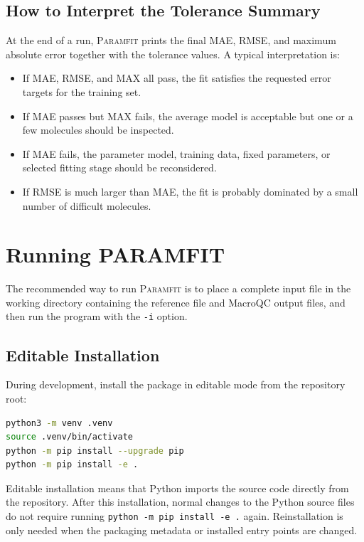 \documentclass[11pt]{article}
\begin{document}
\subsection{How to Interpret the Tolerance Summary}

At the end of a run, \textsc{Paramfit} prints the final MAE, RMSE, and maximum
absolute error together with the tolerance values. A typical interpretation is:

\begin{itemize}[leftmargin=*]
  \item If MAE, RMSE, and MAX all pass, the fit satisfies the requested error
        targets for the training set.
  \item If MAE passes but MAX fails, the average model is acceptable but one or a
        few molecules should be inspected.
  \item If MAE fails, the parameter model, training data, fixed parameters, or
        selected fitting stage should be reconsidered.
  \item If RMSE is much larger than MAE, the fit is probably dominated by a small
        number of difficult molecules.
\end{itemize}

\section{Running PARAMFIT}

The recommended way to run \textsc{Paramfit} is to place a complete input file in
the working directory containing the reference file and MacroQC output files, and
then run the program with the \texttt{-i} option.

\subsection{Editable Installation}

During development, install the package in editable mode from the repository
root:

\begin{lstlisting}[language=bash]
python3 -m venv .venv
source .venv/bin/activate
python -m pip install --upgrade pip
python -m pip install -e .
\end{lstlisting}

Editable installation means that Python imports the source code directly from the
repository. After this installation, normal changes to the Python source files do
not require running \texttt{python -m pip install -e .} again. Reinstallation is
only needed when the packaging metadata or installed entry points are changed.
\end{document}
